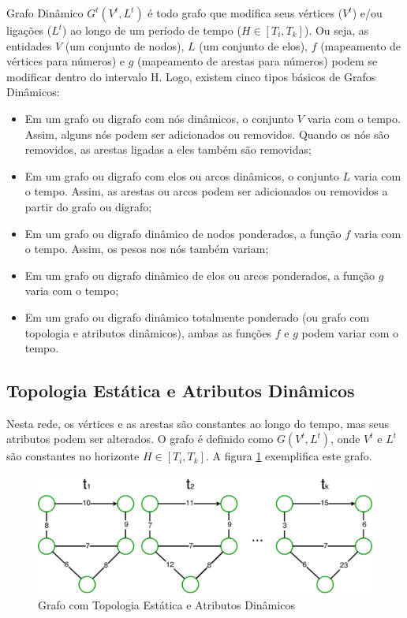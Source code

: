 Grafo Dinâmico $G^t(V^t, L^t)$ é todo grafo que modifica seus vértices ($V^t$) e/ou ligações ($L^t$)
ao longo de um período de tempo ($H \in [T_i, T_k]$). Ou seja, as entidades $V$ (um conjunto de nodos),
$L$ (um conjunto de elos), $f$ (mapeamento de vértices para números) e $g$ (mapeamento de arestas para números)
podem se modificar dentro do intervalo H.
Logo, existem cinco tipos básicos de Grafos Dinâmicos:

\begin{itemize}
\item Em um grafo ou digrafo com nós dinâmicos, o conjunto $V$ varia com o tempo. Assim, alguns nós podem
ser adicionados ou removidos. Quando os nós são removidos, as arestas ligadas a eles também são removidas; 
\item Em um grafo ou digrafo com elos ou arcos dinâmicos, o conjunto $L$ varia com o tempo. Assim, as arestas ou arcos podem
ser adicionados ou removidos a partir do grafo ou digrafo;
\item Em um grafo ou digrafo dinâmico de nodos ponderados, a função $f$ varia com o tempo. Assim, os pesos nos nós também variam;
\item Em um grafo ou digrafo dinâmico de elos ou arcos ponderados, a função $g$ varia com o tempo;
\item Em um grafo ou digrafo dinâmico totalmente ponderado (ou grafo com topologia e atributos dinâmicos), ambas as funções $f$ e $g$
podem variar com o tempo.
\end{itemize}

\subsection{Topologia Estática e Atributos Dinâmicos}
Nesta rede, os vértices e as arestas são constantes ao longo do tempo, mas seus atributos podem ser alterados.
O grafo é definido como $G(V^t, L^t)$, onde $V^t$ e $L^t$ são constantes no horizonte $H \in [T_i, T_k]$.
A figura \ref{fig:tead} exemplifica este grafo.

\begin{figure}[htbp]
\centering
 \includegraphics[width=.80\textwidth]{figuras/tead.png}
\caption{Grafo com Topologia Estática e Atributos Dinâmicos}
\label{fig:tead}
\end{figure}


